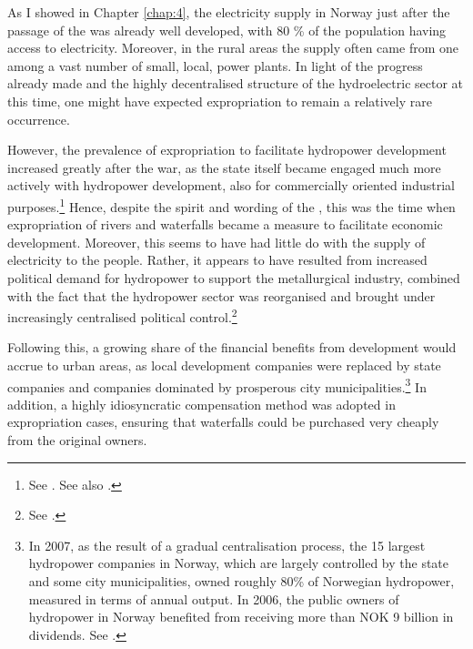 As I showed in Chapter \ref{chap:4}, the electricity supply in Norway just after the passage of the \cite{wra40} was already well developed, with 80 \% of the population having access to electricity. Moreover, in the rural areas the supply often came from one among a vast number of small, local, power plants. In light of the progress already made and the highly decentralised structure of the hydroelectric sector at this time, one might have expected expropriation to remain a relatively rare occurrence.

However, the prevalence of expropriation to facilitate hydropower development increased greatly after the war, as the state itself became engaged much more actively with hydropower development, also for commercially oriented industrial purposes.\footnote{See \cite[59-71]{thue96}. See also \cite{skjold06}.} Hence, despite the spirit and wording of the \cite{wra40}, this was the time when expropriation of rivers and waterfalls became a measure to facilitate economic development. Moreover, this seems to have had little do with the supply of electricity to the people. Rather, it appears to have resulted from increased political demand for hydropower to support the metallurgical industry, combined with the fact that the hydropower sector was reorganised and brought under increasingly centralised political control.\footnote{See \cite[69-71]{thue96}.} %

Following this, a growing share of the financial benefits from development would accrue to urban areas, as local development companies were replaced by state companies and companies dominated by prosperous city municipalities.\footnote{In 2007, as the result of a gradual centralisation process, the 15 largest hydropower companies in Norway, which are largely controlled by the state and some city municipalities, owned roughly 80\% of Norwegian hydropower, measured in terms of annual output. In 2006, the public owners of hydropower in Norway benefited from receiving more than NOK 9 billion in dividends. See \cite[28]{otprp61}.} In addition, a highly idiosyncratic compensation method was adopted in expropriation cases, ensuring that waterfalls could be purchased very cheaply from the original owners.

